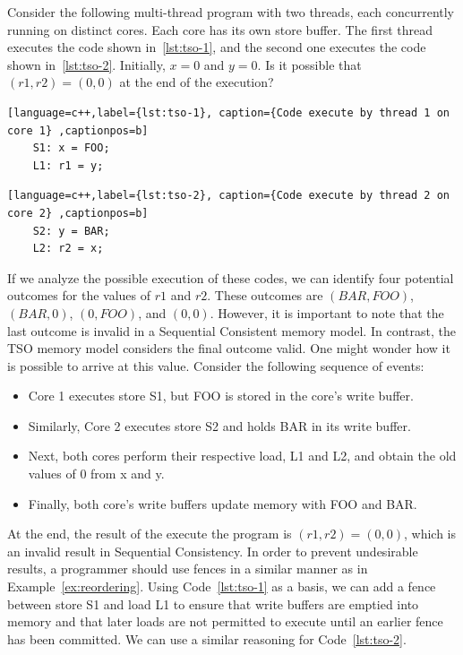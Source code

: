 \begin{example}
  \label{ex:tso-problem}

  Consider the following multi-thread program with two threads, each concurrently running on distinct cores. Each core has its own store buffer. The first thread executes the code shown in~\ref{lst:tso-1}, and the second one executes the code shown in~\ref{lst:tso-2}. Initially, \(x = 0\) and \(y = 0\). Is it possible that \((r1, r2) = (0, 0)\) at the end of the execution?

  \begin{lstlisting}[language=c++,label={lst:tso-1}, caption={Code execute by thread 1 on core 1} ,captionpos=b]
    S1: x = FOO;
    L1: r1 = y;
\end{lstlisting}

\begin{lstlisting}[language=c++,label={lst:tso-2}, caption={Code execute by thread 2 on core 2} ,captionpos=b]
    S2: y = BAR;
    L2: r2 = x;
\end{lstlisting}

  If we analyze the possible execution of these codes, we can identify four potential outcomes for the values of \(r1\) and \(r2\). These outcomes are \((BAR, FOO)\), \((BAR, 0)\), \((0, FOO)\), and \((0, 0)\). However, it is important to note that the last outcome is invalid in a Sequential Consistent memory model. In contrast, the TSO memory model considers the final outcome valid. One might wonder how it is possible to arrive at this value. Consider the following sequence of events:

  \begin{itemize}
    \item Core 1 executes store S1, but FOO is stored in the core's write buffer.
    \item Similarly, Core 2 executes store S2 and holds BAR in its write buffer.
    \item Next, both cores perform their respective load, L1 and L2, and obtain the old values of 0 from x and y.
    \item Finally, both core's write buffers update memory with FOO and BAR.
    \end{itemize}

    At the end, the result of the execute the program is \((r1, r2) = (0, 0)\), which is an invalid result in Sequential Consistency. In order to prevent undesirable results, a programmer should use fences in a similar manner as in Example~\ref{ex:reordering}. Using Code~\ref{lst:tso-1} as a basis, we can add a fence between store S1 and load L1 to ensure that write buffers are emptied into memory and that later loads are not permitted to execute until an earlier fence has been committed. We can use a similar reasoning for Code~\ref{lst:tso-2}.

\end{example}

